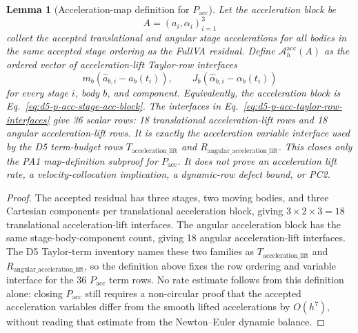\documentclass[preprint,12pt]{elsarticle}
\newtheorem{lemma}{Lemma}
\begin{document}
\begin{lemma}[Acceleration-map definition for \(P_{\mathrm{acc}}\)]
\label{lem:d5-p-acc-map-definition}
Let the acceleration block be
\begin{equation}
\label{eq:d5-p-acc-stage-acc-block}
  A=(a_i,\alpha_i)_{i=1}^3
\end{equation}
collect the accepted translational and angular stage accelerations for all
bodies in the same accepted stage ordering as the FullVA residual.  Define
\(\mathcal A_h^{\mathrm{acc}}(A)\) as the ordered vector of acceleration-lift
Taylor-row interfaces
\begin{equation}
\label{eq:d5-p-acc-taylor-row-interfaces}
  m_b(\widehat a_{b,i}-a_b(t_i)),\qquad
  J_b(\widehat\alpha_{b,i}-\alpha_b(t_i))
\end{equation}
for every stage \(i\), body \(b\), and component. Equivalently, the
acceleration block is Eq.~\eqref{eq:d5-p-acc-stage-acc-block}.  The
interfaces in Eq.~\eqref{eq:d5-p-acc-taylor-row-interfaces} give 36 scalar rows:
18 translational acceleration-lift rows and 18 angular acceleration-lift
rows. It is exactly the acceleration variable interface used by the D5
term-budget rows \(T_{\mathrm{acceleration\_lift}}\) and
\(R_{\mathrm{angular\_acceleration\_lift}}\). This closes only the PA1
map-definition subproof for \(P_{\mathrm{acc}}\). It does not prove an
acceleration lift rate, a velocity-collocation implication, a dynamic-row
defect bound, or PC2.
\end{lemma}

\begin{proof}
The accepted residual has three stages, two moving bodies, and three
Cartesian components per translational acceleration block, giving
\(3\times2\times3=18\) translational acceleration-lift interfaces.  The
angular acceleration block has the same stage-body-component count, giving
18 angular acceleration-lift interfaces.  The D5 Taylor-term inventory names
these two families as \(T_{\mathrm{acceleration\_lift}}\) and
\(R_{\mathrm{angular\_acceleration\_lift}}\), so the definition above fixes
the row ordering and variable interface for the 36 \(P_{\mathrm{acc}}\)
term rows.  No rate estimate follows from this definition alone: closing
\(P_{\mathrm{acc}}\) still requires a non-circular proof that the accepted
acceleration variables differ from the smooth lifted accelerations by
\(O(h^7)\), without reading that estimate from the Newton--Euler dynamic
balance.
\end{proof}
\end{document}
